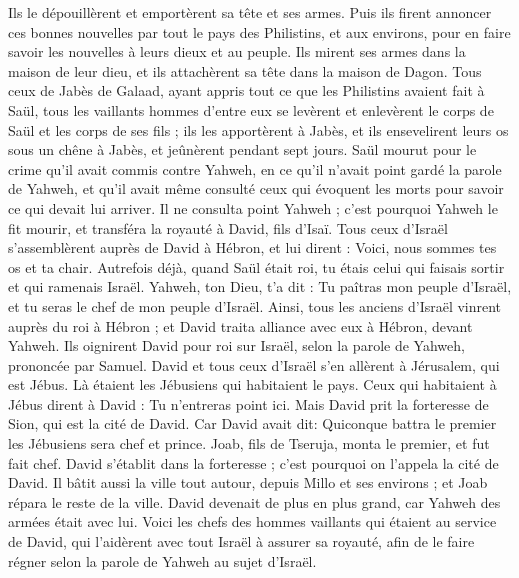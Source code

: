 \begin{multicols}{2}
Ils le dépouillèrent et emportèrent sa tête et ses armes. Puis ils firent annoncer ces bonnes nouvelles par tout le pays des Philistins, et aux environs, pour en faire savoir les nouvelles à leurs dieux et au peuple.
Ils mirent ses armes dans la maison de leur dieu, et ils attachèrent sa tête dans la maison de Dagon.
Tous ceux de Jabès de Galaad, ayant appris tout ce que les Philistins avaient fait à Saül,
tous les vaillants hommes d’entre eux se levèrent et enlevèrent le corps de Saül et les corps de ses fils ; ils les apportèrent à Jabès, et ils ensevelirent leurs os sous un chêne à Jabès, et jeûnèrent pendant sept jours.
Saül mourut pour le crime qu'il avait commis contre Yahweh, en ce qu'il n'avait point gardé la parole de Yahweh, et qu'il avait même consulté ceux qui évoquent les morts pour savoir ce qui devait lui arriver.
Il ne consulta point Yahweh ; c'est pourquoi Yahweh le fit mourir, et transféra la royauté à David, fils d'Isaï.
\VerseOne{}Tous ceux d'Israël s'assemblèrent auprès de David à Hébron, et lui dirent : Voici, nous sommes tes os et ta chair.
Autrefois déjà, quand Saül était roi, tu étais celui qui faisais sortir et qui ramenais Israël. Yahweh, ton Dieu, t'a dit : Tu paîtras mon peuple d'Israël, et tu seras le chef de mon peuple d'Israël.
Ainsi, tous les anciens d'Israël vinrent auprès du roi à Hébron ; et David traita alliance avec eux à Hébron, devant Yahweh. Ils oignirent David pour roi sur Israël, selon la parole de Yahweh, prononcée par Samuel.
David et tous ceux d'Israël s'en allèrent à Jérusalem, qui est Jébus. Là étaient  les Jébusiens qui habitaient le pays.
Ceux qui habitaient à Jébus dirent à David : Tu n'entreras point ici. Mais David prit la forteresse de Sion, qui est la cité de David.
Car David avait dit: Quiconque battra le premier les Jébusiens sera chef et prince. Joab, fils de Tseruja, monta le premier, et fut fait chef.
David s’établit dans la forteresse ; c'est pourquoi on l'appela la cité de David.
Il bâtit aussi la ville tout autour, depuis Millo et ses environs ; et Joab répara le reste de la ville.
David devenait de plus en plus grand, car Yahweh des armées était avec lui.
Voici les chefs des hommes vaillants qui étaient au service de David, qui l’aidèrent avec tout Israël à assurer sa royauté, afin de le faire régner selon la parole de Yahweh au sujet d’Israël.

\end{multicols}
